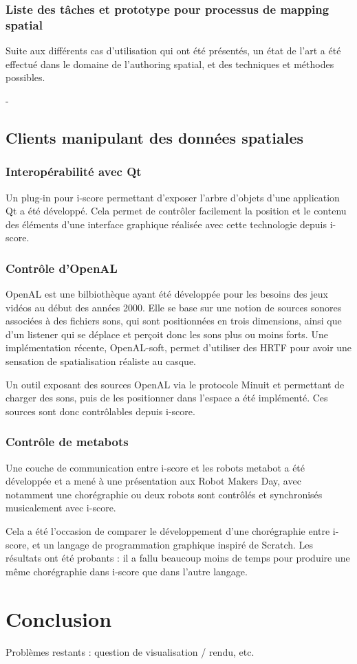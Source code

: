 \documentclass[french]{article}
\begin{document}
\subsubsection{Liste des tâches et prototype pour processus de mapping spatial}
Suite aux différents cas d'utilisation qui ont été présentés, un état de l'art a été effectué dans le domaine de l'authoring spatial, et des techniques et méthodes possibles.

- 


\subsection{Clients manipulant des données spatiales}
\subsubsection{Interopérabilité avec Qt}
Un plug-in pour i-score permettant d'exposer l'arbre d'objets d'une application Qt a été développé. Cela permet de contrôler facilement la position et le contenu des éléments d'une interface graphique réalisée avec cette technologie depuis i-score.

\subsubsection{Contrôle d'OpenAL}
OpenAL est une bilbiothèque ayant été développée pour les besoins des jeux vidéos au début des années 2000. Elle se base sur une notion de sources sonores associées à des fichiers sons, qui sont positionnées en trois dimensions, ainsi que d'un listener qui se déplace et perçoit donc les sons plus ou moins forts. Une implémentation récente, OpenAL-soft, permet d'utiliser des HRTF pour avoir une sensation de spatialisation réaliste au casque.  

Un outil exposant des sources OpenAL via le protocole Minuit et permettant de charger des sons, puis de les positionner dans l'espace a été implémenté. Ces sources sont donc contrôlables depuis i-score.

\subsubsection{Contrôle de metabots}
Une couche de communication entre i-score et les robots metabot %
a été développée et a mené à une présentation aux Robot Makers Day, avec notamment 
une chorégraphie ou deux robots sont contrôlés et synchronisés musicalement avec i-score. 

Cela a été l'occasion de comparer le développement d'une chorégraphie entre i-score, et 
un langage de programmation graphique inspiré de Scratch. Les résultats ont été probants : il a fallu 
beaucoup moins de temps pour produire une même chorégraphie dans i-score que dans l'autre langage.

\section{Conclusion}

Problèmes restants : question de visualisation / rendu, etc.
\end{document}
